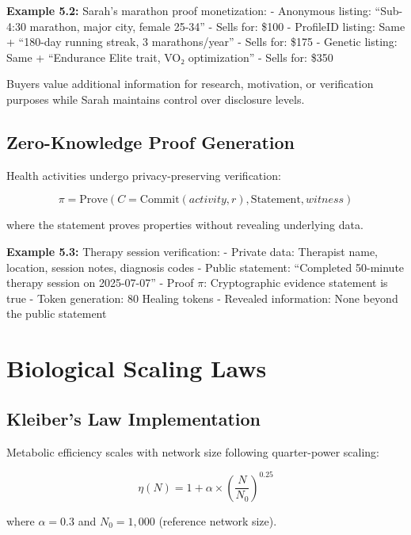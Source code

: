 \documentclass[11pt,letterpaper]{article}
\begin{document}
\textbf{Example 5.2:} Sarah's marathon proof monetization:
- Anonymous listing: ``Sub-4:30 marathon, major city, female 25-34''
- Sells for: \$100
- ProfileID listing: Same + ``180-day running streak, 3 marathons/year''
- Sells for: \$175
- Genetic listing: Same + ``Endurance Elite trait, VO₂ optimization''
- Sells for: \$350

Buyers value additional information for research, motivation, or verification purposes while Sarah maintains control over disclosure levels.

\subsection{Zero-Knowledge Proof Generation}

Health activities undergo privacy-preserving verification:

\begin{equation}
\pi = \text{Prove}\left(C = \text{Commit}(activity, r), \text{Statement}, witness\right)
\end{equation}

where the statement proves properties without revealing underlying data.

\textbf{Example 5.3:} Therapy session verification:
- Private data: Therapist name, location, session notes, diagnosis codes
- Public statement: ``Completed 50-minute therapy session on 2025-07-07''
- Proof $\pi$: Cryptographic evidence statement is true
- Token generation: 80 Healing tokens
- Revealed information: None beyond the public statement

\section{Biological Scaling Laws}

\subsection{Kleiber's Law Implementation}

Metabolic efficiency scales with network size following quarter-power scaling:

\begin{equation}
\eta(N) = 1 + \alpha \times \left(\frac{N}{N_0}\right)^{0.25}
\end{equation}

where $\alpha = 0.3$ and $N_0 = 1,000$ (reference network size).
\end{document}
